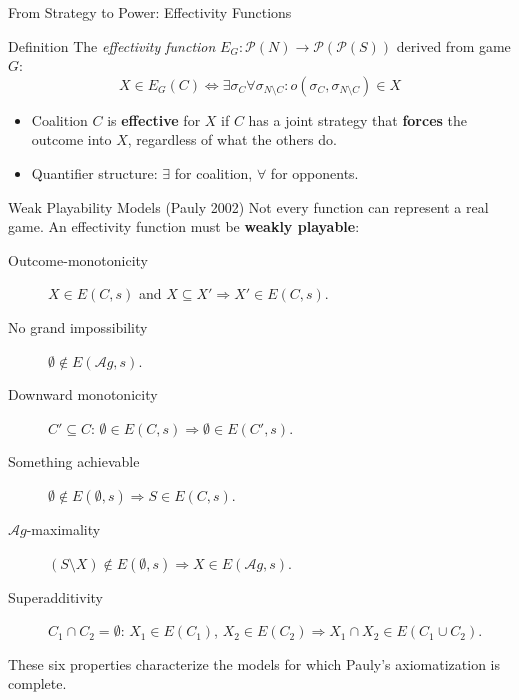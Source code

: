 \documentclass[aspectratio=169, 12pt]{beamer}
\begin{document}
\begin{frame}{From Strategy to Power: Effectivity Functions}
	\begin{block}{Definition}
		The \emph{effectivity function} $E_G: \mathcal{P}(N) \rightarrow \mathcal{P}(\mathcal{P}(S))$ derived from game $G$:
		\[ X \in E_G(C) \iff \exists \sigma_C \forall \sigma_{N \setminus C}: o(\sigma_C, \sigma_{N \setminus C}) \in X \]
	\end{block}

	\begin{itemize}
		\item Coalition $C$ is \textbf{effective} for $X$ if $C$ has a joint strategy that \textbf{forces} the outcome into $X$, regardless of what the others do.
		\item Quantifier structure: $\exists$ for coalition, $\forall$ for opponents.
	\end{itemize}
\end{frame}


\begin{frame}{Weak Playability Models (Pauly 2002)}
	Not every function can represent a real game. An effectivity function must be \textbf{weakly playable}:

	\begin{description}
		\item[Outcome-monotonicity] $X \in E(C, s)$ and $X \subseteq X' \Rightarrow X' \in E(C, s)$.
		\item[No grand impossibility] $\emptyset \notin E(\mathcal{A}g, s)$.
		\item[Downward monotonicity] $C' \subseteq C$: $\emptyset \in E(C, s) \Rightarrow \emptyset \in E(C', s)$.
		\item[Something achievable] $\emptyset \notin E(\emptyset, s) \Rightarrow S \in E(C, s)$.
		\item[$\mathcal{A}g$-maximality] $(S \setminus X) \notin E(\emptyset, s) \Rightarrow X \in E(\mathcal{A}g, s)$.
		\item[Superadditivity] $C_1 \cap C_2 = \emptyset$: $X_1 \in E(C_1)$, $X_2 \in E(C_2) \Rightarrow X_1 \cap X_2 \in E(C_1 \cup C_2)$.
	\end{description}

	\vspace{0.5em}
	These six properties characterize the models for which Pauly's axiomatization is complete.
\end{frame}
\end{document}
